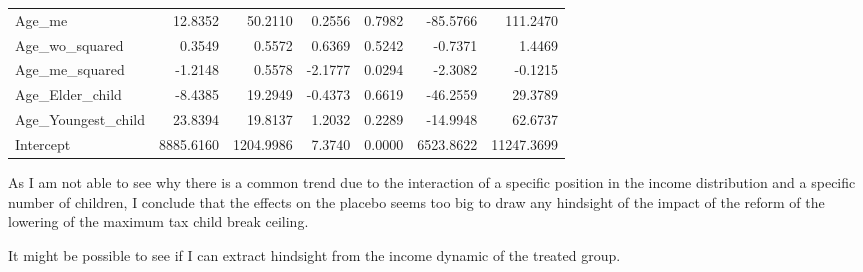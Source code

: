 \begin{subappendices}
\begin{table}[H]
{\begin{tabular}{lrrrrrr}
$$Age_me                                    &     12.8352 &   50.2110 &  0.2556 &      0.7982 &    -85.5766 &    111.2470  \\
Age_wo_squared                            &      0.3549 &    0.5572 &  0.6369 &      0.5242 &     -0.7371 &      1.4469  \\
Age_me_squared                            &     -1.2148 &    0.5578 & -2.1777 &      0.0294 &     -2.3082 &     -0.1215  \\
Age_Elder_child                           &     -8.4385 &   19.2949 & -0.4373 &      0.6619 &    -46.2559 &     29.3789  \\
Age_Youngest_child                        &     23.8394 &   19.8137 &  1.2032 &      0.2289 &    -14.9948 &     62.6737  \\
Intercept                                 &   8885.6160 & 1204.9986 &  7.3740 &      0.0000 &   6523.8622 &  11247.3699  \\
\hline
\end{tabular}
}
\end{table} 
As I am not able to see why there is a common trend due to the interaction of a specific position in the income distribution and a specific number of children, I conclude that the effects on the placebo seems too big to draw any hindsight of the impact of the reform of the lowering of the maximum tax child break ceiling. 

It might be possible to see if I can extract hindsight from the income dynamic of the treated group.



\end{subappendices}
